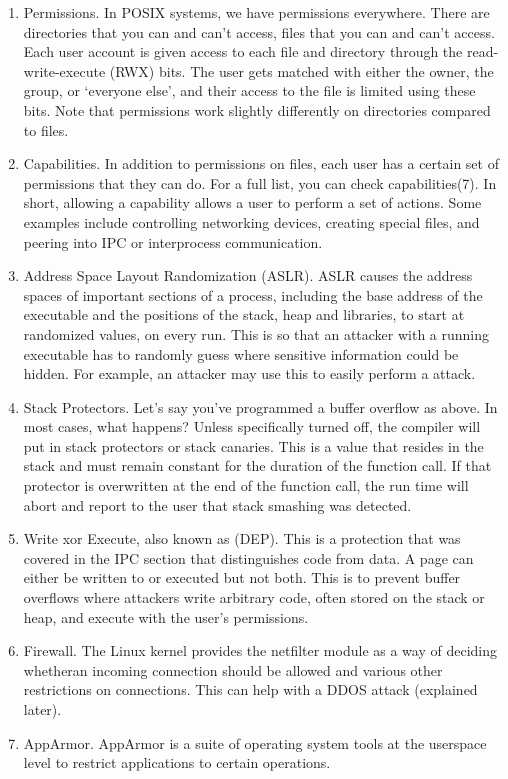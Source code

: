 \begin{enumerate}
\item Permissions.
  In POSIX systems, we have permissions everywhere.
  There are directories that you can and can't access, files that you can and can't access.
  Each user account is given access to each file and directory through the read-write-execute (RWX) bits.
  The user gets matched with either the owner, the group, or `everyone else', and their access to the file is limited using these bits.
  Note that permissions work slightly differently on directories compared to files.
\item Capabilities.
  In addition to permissions on files, each user has a certain set of permissions that they can do.
  For a full list, you can check capabilities(7).
  In short, allowing a capability allows a user to perform a set of actions.
  Some examples include controlling networking devices, creating special files, and peering into IPC or interprocess communication.
\item Address Space Layout Randomization (ASLR).
  ASLR causes the address spaces of important sections of a process, including the base address of the executable and the positions of the stack, heap and libraries, to start at randomized values, on every run.
  This is so that an attacker with a running executable has to randomly guess where sensitive information could be hidden.
  For example, an attacker may use this to easily perform a  attack.
\item Stack Protectors.
  Let's say you've programmed a buffer overflow as above.
  In most cases, what happens?
  Unless specifically turned off, the compiler will put in stack protectors or stack canaries. This is a value that resides in the stack and must remain constant for the duration of the function call. If that protector is overwritten at the end of the function call, the run time will abort and report to the user that stack smashing was detected.
\item Write xor Execute, also known as  (DEP).
  This is a protection that was covered in the IPC section that distinguishes code from data.
  A page can either be written to or executed but not both.
  This is to prevent buffer overflows where attackers write arbitrary code, often stored on the stack or heap, and execute with the user's permissions.
\item Firewall.
  The Linux kernel provides the netfilter module as a way of deciding whetheran incoming connection should be allowed and various other restrictions on connections.
  This can help with a DDOS attack (explained later).
\item AppArmor.
  AppArmor is a suite of operating system tools at the userspace level to restrict applications to certain operations.
\end{enumerate}

